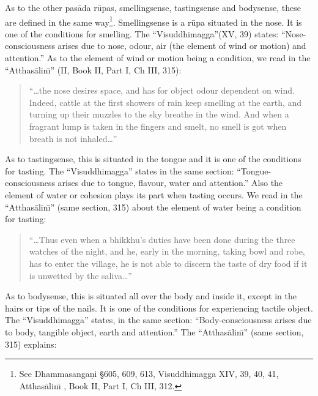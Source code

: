 \documentclass{book}
\begin{document}
As to the other pas{\=a}da r\=upas, smellingsense, tastingsense and
bodysense, these are defined in the same way\footnote{See
Dhamma\-sanga\d ni {\S}605, 609, 613, Visuddhimagga XIV, 39, 40, 41,
Atthas{\=a}lin\=\i{} , Book II, Part I, Ch III, 312.}. Smell\-ing\-sense is a
r\=upa situated in the nose. It is one of the conditions for smelling.
The ``Visuddhimagga''(XV, 39) states: ``Nose-consciousness arises due
to nose, odour, air (the element of wind or motion) and attention.'' As
to the element of wind or motion being a condition, we read in the
``Atthas{\=a}lin\=\i'' (II, Book II, Part I, Ch III, 315):




\begin{quote}\begin{flushleft}
``\ldots the nose desires space, and has for object odour dependent on
wind. Indeed, cattle at the first showers of rain keep smelling at the
earth, and turning up their muzzles to the sky breathe in the wind. And
when a fragrant lump is taken in the fingers and smelt, no smell is got
when breath is not inhaled\ldots''
\end{flushleft}\end{quote}




As to tastingsense, this is situated in the tongue and it is one of the
conditions for tasting. The ``Visuddhimagga'' states in the same
section: ``Tongue-consciousness arises due to tongue, flavour, water
and attention.'' Also the element of water or cohesion plays its part
when tasting occurs. We read in the ``Atthas{\=a}lin\=\i'' (same
section, 315) about the element of water being a condition for tasting:




\begin{quote}\begin{flushleft}
``\ldots Thus even when a bhikkhu's duties have been done during the three
watches of the night, and he, early in the morning, taking bowl and
robe, has to enter the village, he is not able to discern the taste of
dry food if it is unwetted by the saliva\ldots''

\end{flushleft}\end{quote}



As to bodysense, this is situated all over the body and inside it,
except in the hairs or tips of the nails. It is one of the conditions
for experiencing tactile object. The ``Visuddhimagga'' states, in the
same section: ``Body-consciousness arises due to body, tangible
object, earth and attention.'' The ``Atthas{\=a}lin\=\i'' (same section,
315) explains:
\end{document}
